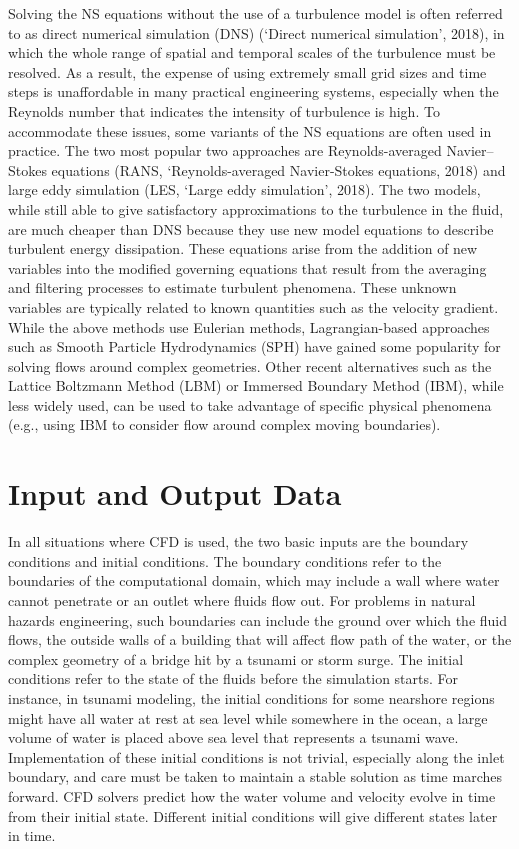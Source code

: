 Solving the NS equations without the use of a turbulence model is often referred to as direct numerical simulation (DNS) (‘Direct numerical simulation’, 2018), in which the whole range of spatial and temporal scales of the turbulence must be resolved. As a result, the expense of using extremely small grid sizes and time steps is unaffordable in many practical engineering systems, especially when the Reynolds number that indicates the intensity of turbulence is high. To accommodate these issues, some variants of the NS equations are often used in practice. The two most popular two approaches are Reynolds-averaged Navier–Stokes equations (RANS, ‘Reynolds-averaged Navier-Stokes equations, 2018) and large eddy simulation (LES, ‘Large eddy simulation’, 2018). The two models, while still able to give satisfactory approximations to the turbulence in the fluid, are much cheaper than DNS because they use new model equations to describe turbulent energy dissipation. These equations arise from the addition of new variables into the modified governing equations that result from the averaging and filtering processes to estimate turbulent phenomena.  These unknown variables are typically related to known quantities such as the velocity gradient.  
While the above methods use Eulerian methods, Lagrangian-based approaches such as Smooth Particle Hydrodynamics (SPH) have gained some popularity for solving flows around complex geometries.  Other recent alternatives such as the Lattice Boltzmann Method (LBM) or Immersed Boundary Method (IBM), while less widely used, can be used to take advantage of specific physical phenomena (e.g., using IBM to consider flow around complex moving boundaries).  
 
\section{Input and Output Data}
\label{sec:resp_cfd_water_io}

In all situations where CFD is used, the two basic inputs are the boundary conditions and initial conditions. The boundary conditions refer to the boundaries of the computational domain, which may include a wall where water cannot penetrate or an outlet where fluids flow out. For problems in natural hazards engineering, such boundaries can include the ground over which the fluid flows, the outside walls of a building that will affect flow path of the water, or the complex geometry of a bridge hit by a tsunami or storm surge. The initial conditions refer to the state of the fluids before the simulation starts. For instance, in tsunami modeling, the initial conditions for some nearshore regions might have all water at rest at sea level while somewhere in the ocean, a large volume of water is placed above sea level that represents a tsunami wave. Implementation of these initial conditions is not trivial, especially along the inlet boundary, and care must be taken to maintain a stable solution as time marches forward.  CFD solvers predict how the water volume and velocity evolve in time from their initial state. Different initial conditions will give different states later in time.

